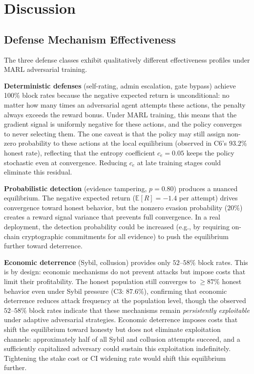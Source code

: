 \section{Discussion}
\label{sec:discussion}

\subsection{Defense Mechanism Effectiveness}

The three defense classes exhibit qualitatively different effectiveness
profiles under MARL adversarial training.

\textbf{Deterministic defenses} (self-rating, admin escalation, gate bypass)
achieve 100\% block rates because the negative expected return is
unconditional: no matter how many times an adversarial agent attempts these
actions, the penalty always exceeds the reward bonus.  Under MARL training,
this means that the gradient signal is uniformly negative for these actions,
and the policy converges to never selecting them.  The one caveat is that
the policy may still assign non-zero probability to these actions at the
local equilibrium (observed in C6's $93.2\%$ honest rate), reflecting that
the entropy coefficient $c_e = 0.05$ keeps the policy stochastic even at
convergence.  Reducing $c_e$ at late training stages could eliminate this
residual.

\textbf{Probabilistic detection} (evidence tampering, $p=0.80$) produces
a nuanced equilibrium.  The negative expected return ($\mathbb{E}[R] = -1.4$
per attempt) drives convergence toward honest behavior, but the nonzero
evasion probability ($20\%$) creates a reward signal variance that prevents
full convergence.  In a real deployment, the detection probability could be
increased (e.g., by requiring on-chain cryptographic commitments for all
evidence) to push the equilibrium further toward deterrence.

\textbf{Economic deterrence} (Sybil, collusion) provides only $52$--$58\%$
block rates.  This is by design: economic mechanisms do not prevent attacks
but impose costs that limit their profitability.  The honest population
still converges to $\geq\!87\%$ honest behavior even under Sybil pressure
(C3: $87.6\%$), confirming that economic deterrence reduces attack frequency at the
population level, though the observed $52$--$58\%$ block rates indicate that
these mechanisms remain \emph{persistently exploitable} under adaptive
adversarial strategies.  Economic deterrence imposes costs that shift the
equilibrium toward honesty but does not eliminate exploitation channels:
approximately half of all Sybil and collusion attempts succeed, and a
sufficiently capitalized adversary could sustain this exploitation
indefinitely.  Tightening the stake cost or CI widening rate would shift
this equilibrium further.

